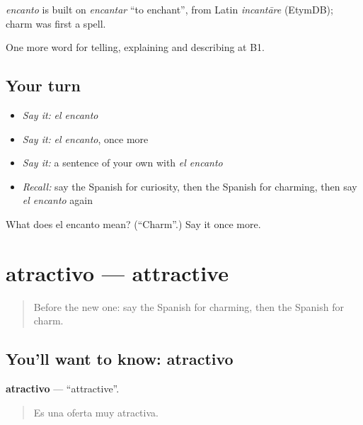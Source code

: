 \begin{cousinweb}
\emph{encanto} is built on \emph{encantar} \textquotedblleft{}to enchant\textquotedblright{}, from Latin \emph{incantāre} (EtymDB); charm was first a spell.
\end{cousinweb}

\begin{grammarlens}[title={What you've built}]
One more word for telling, explaining and describing at B1.
\end{grammarlens}

\subsection*{Your turn}
\begin{itemize}
\raggedright
  \item \emph{Say it:} \emph{el encanto}
  \item \emph{Say it:} \emph{el encanto}, once more
  \item \emph{Say it:} a sentence of your own with \emph{el encanto}
  \item \emph{Recall:} say the Spanish for curiosity, then the Spanish for charming, then say \emph{el encanto} again
\end{itemize}

\begin{tcolorbox}[breakable,colback=teal!4,colframe=teal!35!black,title={Before you move on}]
What does el encanto mean? (\textquotedblleft{}Charm\textquotedblright{}.) Say it once more.
\end{tcolorbox}
\section[atractivo]{atractivo — attractive}

\label{lesson:ES-C730-atractivo}



\begin{quote}
Before the new one: say the Spanish for charming, then the Spanish for charm.
\end{quote}

\subsection*{You'll want to know: atractivo}
\textbf{atractivo} — \textquotedblleft{}attractive\textquotedblright{}.

\begin{quote}
Es una oferta muy atractiva.
\end{quote}

